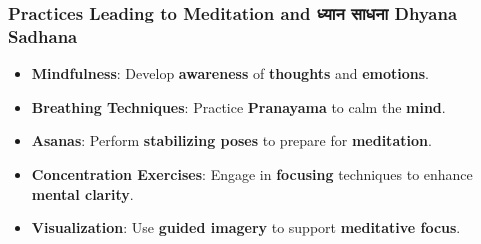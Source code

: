 \begin{frame}[fragile]\frametitle{Practices Leading to Meditation and ध्यान साधना  Dhyana Sadhana}

      \begin{itemize}
        \item \textbf{Mindfulness}: Develop \textbf{awareness} of \textbf{thoughts} and \textbf{emotions}.
        \item \textbf{Breathing Techniques}: Practice \textbf{Pranayama} to calm the \textbf{mind}.
        \item \textbf{Asanas}: Perform \textbf{stabilizing poses} to prepare for \textbf{meditation}.
        \item \textbf{Concentration Exercises}: Engage in \textbf{focusing} techniques to enhance \textbf{mental clarity}.
        \item \textbf{Visualization}: Use \textbf{guided imagery} to support \textbf{meditative focus}.
      \end{itemize}
 
\end{frame}








